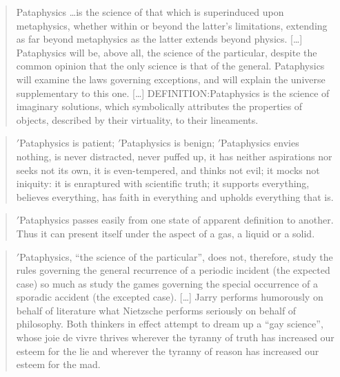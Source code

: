 \begin{quotation}
  Pataphysics \ldots is the science of that which is superinduced upon metaphysics, whether within or beyond the latter's limitations, extending as far beyond metaphysics as the latter extends beyond physics. [\ldots] Pataphysics will be, above all, the science of the particular, despite the common opinion that the only science is that of the general. Pataphysics will examine the laws governing exceptions, and will explain the universe supplementary to this one. [\ldots] DEFINITION:\@ Pataphysics is the science of imaginary solutions, which symbolically attributes the properties of objects, described by their virtuality, to their lineaments. 
\end{quotation}

\begin{quotation}
  $'$Pataphysics is patient; $'$Pataphysics is benign; $'$Pataphysics envies nothing, is never distracted, never puffed up, it has neither aspirations nor seeks not its own, it is even-tempered, and thinks not evil; it mocks not iniquity: it is enraptured with scientific truth; it supports everything, believes everything, has faith in everything and upholds everything that is. 
\end{quotation}

\begin{quotation}
  $'$Pataphysics passes easily from one state of apparent definition to another. Thus it can present itself under the aspect of a gas, a liquid or a solid. 
\end{quotation}

\begin{quotation}
  $'$Pataphysics, ``the science of the particular'', does not, therefore, study the rules governing the general recurrence of a periodic incident (the expected case) so much as study the games governing the special occurrence of a sporadic accident (the excepted case). […] Jarry performs humorously on behalf of literature what Nietzsche performs seriously on behalf of philosophy. Both thinkers in effect attempt to dream up a ``gay science'', whose joie de vivre thrives wherever the tyranny of truth has increased our esteem for the lie and wherever the tyranny of reason has increased our esteem for the mad. 
\end{quotation}

